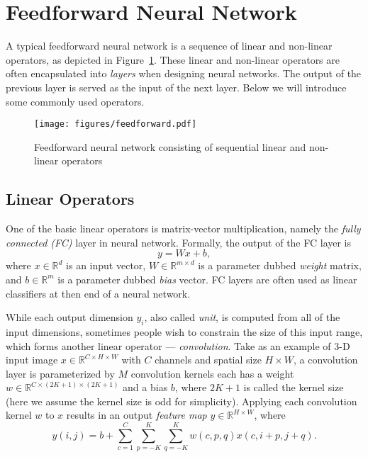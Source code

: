 \section{Feedforward Neural Network} %
\label{sec:dl-feedforward}
A typical feedforward neural network is a sequence of linear and non-linear operators, as depicted in Figure~\ref{fig:dl-feedforward}. These linear and non-linear operators are often encapsulated into \emph{layers} when designing neural networks. The output of the previous layer is served as the input of the next layer. Below we will introduce some commonly used operators.
\begin{figure}[t]
\begin{center}
\texttt{[image: figures/feedforward.pdf]}
\caption{Feedforward neural network consisting of sequential linear and non-linear operators}
\label{fig:dl-feedforward}
\end{center}
\end{figure}

\subsection{Linear Operators} %
\label{sub:dl-linops}
One of the basic linear operators is matrix-vector multiplication, namely the \emph{fully connected (FC)} layer in neural network. Formally, the output of the FC layer is
\begin{equation}
  y=Wx+b,
\end{equation}
where $x\in\mathbb{R}^d$ is an input vector, $W\in\mathbb{R}^{m\times d}$ is a parameter dubbed \emph{weight} matrix, and $b\in\mathbb{R}^m$ is a parameter dubbed \emph{bias} vector. FC layers are often used as linear classifiers at then end of a neural network.

While each output dimension $y_i$, also called \emph{unit}, is computed from all of the input dimensions, sometimes people wish to constrain the size of this input range, which forms another linear operator --- \emph{convolution}. Take as an example of 3-D input image $x\in\mathbb{R}^{C\times H\times W}$ with $C$ channels and spatial size $H\times W$, a convolution layer is parameterized by $M$ convolution kernels each has a weight $w\in\mathbb{R}^{C\times (2K+1)\times (2K+1)}$ and a bias $b$, where $2K+1$ is called the kernel size (here we assume the kernel size is odd for simplicity). Applying each convolution kernel $w$ to $x$ results in an output \emph{feature map} $y\in\mathbb{R}^{H\times W}$, where
\begin{equation}
  y(i,j) = b + \sum_{c=1}^C \sum_{p=-K}^K \sum_{q=-K}^K w(c,p,q) x(c,i+p,j+q).
\end{equation}


